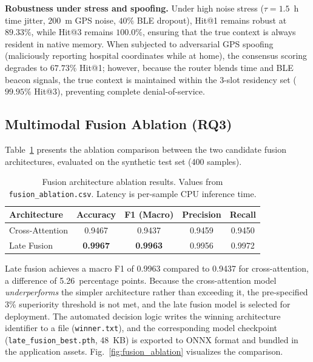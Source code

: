 \documentclass[journal]{IEEEtran}
\begin{document}
\textbf{Robustness under stress and spoofing.} Under high noise stress ($\tau = 1.5$~h time jitter, $200$~m GPS noise, $40\%$ BLE dropout), Hit@1 remains robust at $89.33\%$, while Hit@3 remains $100.0\%$, ensuring that the true context is always resident in native memory. When subjected to adversarial GPS spoofing (maliciously reporting hospital coordinates while at home), the consensus scoring degrades to $67.73\%$ Hit@1; however, because the router blends time and BLE beacon signals, the true context is maintained within the 3-slot residency set ($99.95\%$ Hit@3), preventing complete denial-of-service.

\subsection{Multimodal Fusion Ablation (RQ3)}
\label{sec:results_fusion}

Table~\ref{tab:fusion} presents the ablation comparison between the two candidate fusion architectures, evaluated on the synthetic test set (400 samples).

\begin{table}[htbp]
\centering
\caption{Fusion architecture ablation results. Values from \texttt{fusion\_ablation.csv}. Latency is per-sample CPU inference time.}
\label{tab:fusion}
\begin{tabular}{lcccc}
\hline
\textbf{Architecture} & \textbf{Accuracy} & \textbf{F1 (Macro)} & \textbf{Precision} & \textbf{Recall} \\
\hline
Cross-Attention & 0.9467 & 0.9437 & 0.9459 & 0.9450 \\
Late Fusion     & \textbf{0.9967} & \textbf{0.9963} & 0.9956 & 0.9972 \\
\hline
\end{tabular}
\end{table}

Late fusion achieves a macro F1 of 0.9963 compared to 0.9437 for cross-attention, a difference of 5.26~percentage points. Because the cross-attention model \emph{underperforms} the simpler architecture rather than exceeding it, the pre-specified 3\% superiority threshold is not met, and the late fusion model is selected for deployment. The automated decision logic writes the winning architecture identifier to a file (\texttt{winner.txt}), and the corresponding model checkpoint (\texttt{late\_fusion\_best.pth}, 48~KB) is exported to ONNX format and bundled in the application assets. Fig.~\ref{fig:fusion_ablation} visualizes the comparison.
\end{document}
